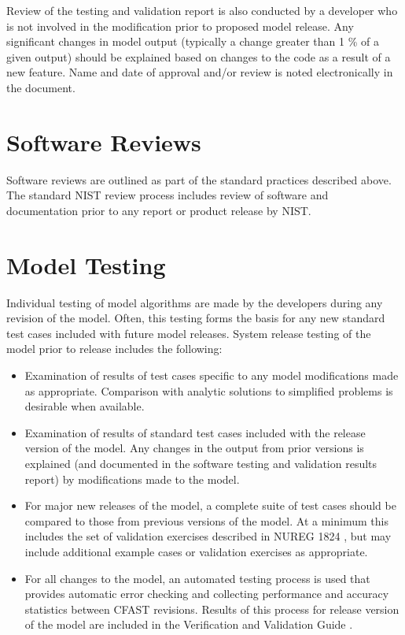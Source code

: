 \documentclass[12pt]{book}
\begin{document}
Review of the testing and validation report is also conducted by a developer who is not involved in the modification prior to proposed model release. Any significant changes in model output (typically a change greater than 1 \% of a given output) should be explained based on changes to the code as a result of a new feature.  Name and date of approval and/or review is noted electronically in the document.

\section{Software Reviews}

Software reviews are outlined as part of the standard practices described above.  The standard NIST review process includes review of software and documentation prior to any report or product release by NIST.

\section{Model Testing}

Individual testing of model algorithms are made by the developers during any revision of the model. Often, this testing forms the basis for any new standard test cases included with future model releases. System release testing of the model prior to release includes the following:

\begin{itemize}
\item Examination of results of test cases specific to any model modifications made as appropriate.  Comparison with analytic solutions to simplified problems is desirable when available.

\item Examination of results of standard test cases included with the release version of the model. Any changes in the output from prior versions is explained (and documented in the software testing and validation results report) by modifications made to the model.

\item For major new releases of the model, a complete suite of test cases should be compared to those from previous versions of the model.  At a minimum this includes the set of validation exercises described in NUREG 1824 \cite{NRCNUREG1824}, but may include additional example cases or validation exercises as appropriate.

\item For all changes to the model, an automated testing process is used that provides automatic error checking and collecting performance and accuracy statistics between CFAST revisions. Results of this process for release version of the model are included in the Verification and Validation Guide \cite{CFAST_Valid_Guide_7}.
\end{itemize}
\end{document}
